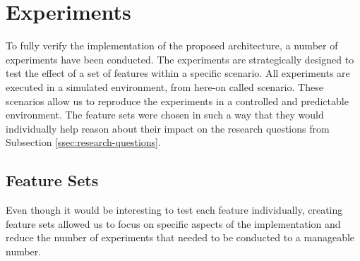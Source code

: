 \section{Experiments}
\label{sec:experiments}
To fully verify the implementation of the proposed architecture, a number of experiments have been conducted. The experiments are strategically designed to test the effect of a set of features within a specific scenario. All experiments are executed in a simulated environment, from here-on called scenario. These scenarios allow us to reproduce the experiments in a controlled and predictable environment. The feature sets were chosen in such a way that they would individually help reason about their impact on the research questions from Subsection \ref{ssec:research-questions}. 

        

\subsection{Feature Sets}
Even though it would be interesting to test each feature individually, creating feature sets allowed us to focus on specific aspects of the implementation and reduce the number of experiments that needed to be conducted to a manageable number. 

